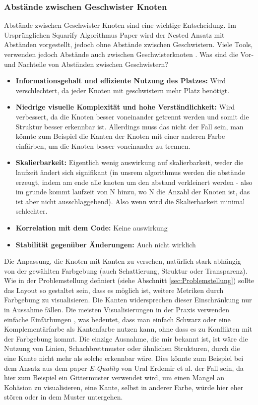 \subsubsection{Abstände zwischen Geschwister Knoten} \label{sec:AbständeGeschwister}
Abstände zwischen Geschwister Knoten sind eine wichtige Entscheidung. Im Ursprünglichen Squarify Algorithmus Paper \cite{bruls2000squarified} wird der Nested Ansatz mit Abständen vorgestellt, jedoch ohne Abstände zwischen Geschwistern. Viele Tools, verwenden jedoch Abstände auch zwischen Geschwisterknoten \cite{codeCity1, code_charta_webdemo, sereene_website}.
Was sind die Vor- und Nachteile von Abständen zwischen Geschwistern?
\begin{itemize}
    \item \textbf{Informationsgehalt und effiziente Nutzung des Platzes:} Wird verschlechtert, da jeder Knoten mit geschwistern mehr Platz benötigt. 
    \item \textbf{Niedrige visuelle Komplexität und hohe Verständlichkeit:} Wird verbessert, da die Knoten besser voneinander getrennt werden und somit die Struktur besser erkennbar ist. Allerdings muss das nicht der Fall sein, man könnte zum Beispiel die Kanten der Knoten mit einer anderen Farbe einfärben, um die Knoten besser voneinander zu trennen.
    \item \textbf{Skalierbarkeit:} Eigentlich wenig auswirkung auf skalierbarkeit, weder die laufzeit ändert sich signifikant (in unsrem algorithmus werden die abstände erzeugt, indem am ende alle knoten um den abstand verkleinert werden - also im grunde kommt laufzeit von N hinzu, wo N die Anzahl der Knoten ist, das ist aber nicht ausschlaggebend). Also wenn wird die Skalierbarkeit minimal schlechter.
    \item \textbf{Korrelation mit dem Code:} Keine auswirkung
    \item \textbf{Stabilität gegenüber Änderungen:} Auch nicht wirklich
\end{itemize}

Die Anpassung, die Knoten mit Kanten zu versehen, natürlich stark abhängig von der gewählten Farbgebung (auch Schattierung, Struktur oder Transparenz). Wie in der Problemstellung definiert (siehe Abschnitt \ref{sec:Problemstellung}) sollte das Layout so gestaltet sein, dass es möglich ist, weitere Metriken durch Farbgebung zu visualisieren. Die Kanten widersprechen dieser Einschränkung nur in Aussahme fällen. Die meisten Visualisierungen in der Praxis verwenden einfache Einfärbungen \cite{codeCity1, code_charta_webdemo, sereene_website}, was bedeutet, dass man einfach Schwarz oder eine Komplementärfarbe als Kantenfarbe nutzen kann, ohne dass es zu Konflikten mit der Farbgebung kommt. Die einzige Ausnahme, die mir bekannt ist, ist wäre die Nutzung von Linien, Schachbrettmuster oder ähnlichen Strukturen, durch die eine Kante nicht mehr als solche erkennbar wäre. Dies könnte zum Beispiel bei dem Ansatz aus dem paper \textit{E-Quality} von Ural Erdemir et al. \cite{eQuality} der Fall sein, da hier zum Beispiel ein Gittermuster verwendet wird, um einen Mangel an Kohäsion zu visualisieren, eine Kante, selbst in anderer Farbe, würde hier eher stören oder in dem Muster untergehen. 


